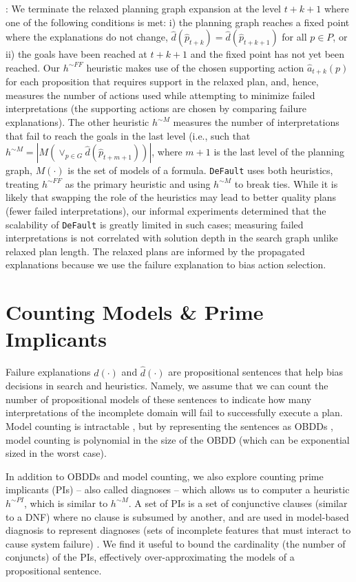 \documentclass[letterpaper]{article}
\def\und#1{\noindent{\bf #1}:}
\def\default{{\tt DeFault}}
\def\citep#1{\cite{#1}}
\begin{document}
\und{Heuristic Computation}   We terminate the relaxed planning graph expansion
at the level $t+k+1$ where one of the following conditions is met: i) the
planning graph reaches a fixed point where the explanations do not change,
$\hat{d}(\hat{p}_{t+k}) = \hat{d}(\hat{p}_{t+k+1})$ for all $p\in P$, or ii) the
goals have been reached at $t+k+1$ and the fixed point has not yet been reached.
Our $h^{\sim FF}$ heuristic makes use of the chosen supporting action
$\hat{a}_{t+k}(p)$ for each proposition that requires support in the relaxed
plan, and, hence, measures the number of actions used while attempting to
minimize failed interpretations (the supporting actions are chosen by comparing
failure explanations). The other heuristic $h^{\sim M}$ measures the number of
interpretations that fail to reach the goals in the last level (i.e., such that
$h^{\sim M} = |M(\vee_{p \in G} \hat{d}(\hat{p}_{t+m+1}))|$, where $m+1$ is the
last level of the planning graph, $M(\cdot)$ is the set of models of a formula.
\default{} uses both heuristics, treating $h^{\sim FF}$ as the primary heuristic
and using $h^{\sim M}$ to break ties. While it is likely that swapping the role
of the heuristics may lead to better quality plans (fewer failed
interpretations), our informal experiments determined that the scalability of
\default{} is greatly limited in such cases; measuring failed interpretations is
not correlated with solution depth in the search graph unlike relaxed plan
length.  The relaxed plans are informed by the propagated explanations because
we use the failure explanation to bias action selection.

\section{Counting Models \& Prime Implicants }

Failure explanations $d(\cdot)$ and $\hat{d}(\cdot)$ are propositional sentences
that help bias decisions in search and heuristics.  Namely, we assume that we
can count the number of propositional models of these sentences to indicate how
many interpretations of the incomplete domain will fail to successfully execute
a plan.  Model counting is intractable \citep{Roth96}, but by representing the
sentences as OBDDs \citep{bryant-ieeetc86}, model counting is polynomial in the
size of the OBDD \citep{darwiche} (which can be exponential sized in the worst
case).

In addition to OBDDs and model counting, we also explore counting prime
implicants (PIs) -- also called diagnoses -- which allows us to computer a
heuristic $h^{\sim PI}$, which is similar to $h^{\sim M}$. A set of PIs is a set
of conjunctive clauses (similar to a DNF) where no clause is subsumed by another, and are used in model-based diagnosis to represent diagnoses (sets of incomplete features
that must interact to cause system failure) \citep{dekleer}.  We find it useful
to bound the cardinality (the number of conjuncts) of the PIs, effectively
over-approximating the models of a propositional sentence.
\end{document}
